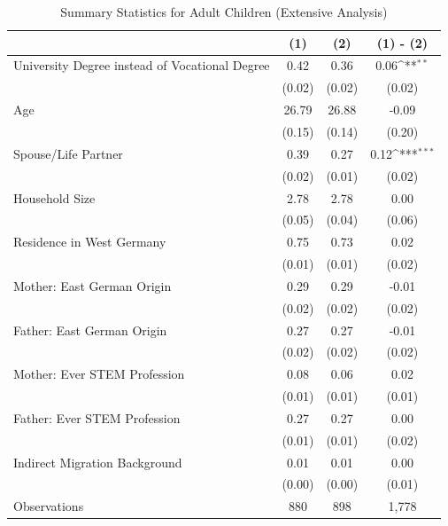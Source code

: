 \documentclass[a4paper, oneside, hyperfootnotes = false]{article}
\def\sym#1{\ifmmode^{#1}\else\(^{#1}\)\fi}
\begin{document}
{\begin{table}[ht]
	\caption{Summary Statistics for Adult Children (Extensive Analysis)}
	\label{tab:descr_summary_epid_ext}
	\begin{center}
		\begin{tabular}{l*{3}{c}}
			\toprule
			& (1) & (2) & (1) - (2) \\
			\midrule
			University Degree instead of Vocational Degree & 0.42  & 0.36 & 0.06\sym{**}    \\
			&   (0.02)  & (0.02) & (0.02) \\
			\addlinespace
			Age         &   26.79   &  26.88   &  -0.09    \\
			&     (0.15) &        (0.14)         &      (0.20) \\
			\addlinespace
			Spouse/Life Partner &   0.39    &  0.27 &   0.12\sym{***}    \\
			&      (0.02)&          (0.01)&         (0.02) \\
			\addlinespace
			Household Size      &  2.78   & 2.78    &   0.00        \\
			&          (0.05)&       (0.04)   &   (0.06) \\
			\addlinespace
			Residence in West Germany  &  0.75   &  0.73   &  0.02    \\
			&         (0.01) &       (0.01)&  (0.02)\\
			\addlinespace
			Mother: East German Origin &  0.29   & 0.29    &  -0.01       \\
			&         (0.02) &   (0.02)&  (0.02)\\
			\addlinespace
			Father: East German Origin &  0.27   &   0.27  &    -0.01     \\
			&         (0.02) &       (0.02)&  (0.02)\\
			\addlinespace
			Mother: Ever STEM Profession & 0.08   &  0.06   &  0.02   \\
			&         (0.01) &       (0.01) &  (0.01) \\
			\addlinespace
			Father: Ever STEM Profession &   0.27  &  0.27   &  0.00   \\
			&         (0.01) &       (0.01)&  (0.02)\\
			\addlinespace
			Indirect Migration Background &  0.01   & 0.01    &  0.00    \\
			&         (0.00) &       (0.00)&  (0.01) \\
			\midrule
			Observations        &  880     &  898     &        1,778            \\
			\bottomrule
		\end{tabular}
		

\end{center}
\end{table}}
\end{document}
